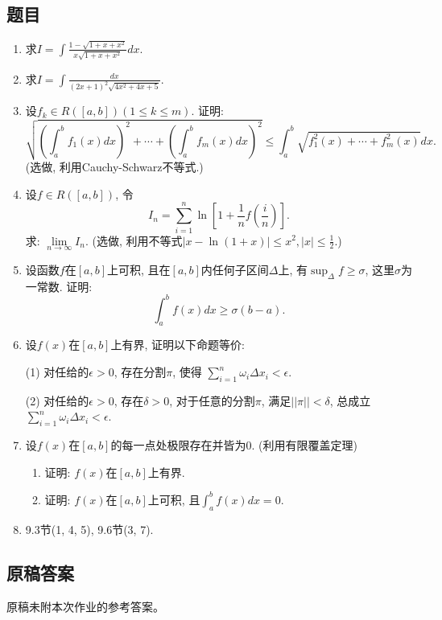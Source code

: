 \documentclass[UTF8,11pt, a4paper, oneside, fontset=none]{ctexbook}
\begin{document}
\subsection*{题目}
\begin{enumerate}

\item 求$I = \int \frac{1 - \sqrt{1 + x + x^2}}{x \sqrt{1 + x + x^2}}dx$.
\item 求$I = \int \frac{dx}{(2x+1)^2 \sqrt{4x^2 + 4x + 5}}$.

\item 设$f_k \in R([a, b]) (1 \leq k \leq m)$. 证明:
\[
\sqrt{ \left( \int_a^b f_1(x)dx \right)^2 + \cdots +  \left( \int_a^b f_m(x)dx \right)^2   } \leq \int_a^b \sqrt{f_1^2(x) + \cdots + f_m^2(x)} dx.
\]
(选做, 利用Cauchy-Schwarz不等式.)
\item 设$f \in R([a, b])$, 令
\[
I_n = \sum_{i=1}^n \ln \left[ 1 + \frac{1}{n}f\left( \frac{i}{n} \right) \right].
\]
求: $\lim\limits_{n \to \infty} I_n$.
(选做, 利用不等式$|x - \ln (1+x) | \leq x^2, |x| \leq \frac{1}{2}$.)
\item 设函数$f$在$[a, b]$上可积, 且在$[a, b]$内任何子区间$\Delta$上, 有$\sup_{\Delta} f \geq \sigma $, 这里$\sigma$为一常数. 证明:
\[
\int_a^b f(x) dx \geq \sigma (b-a).
\]

 
 \item 设$f(x)$在$[a, b]$上有界, 证明以下命题等价:

(1) 对任给的$\epsilon >0$, 存在分割$\pi$, 使得 $\sum_{i=1}^n \omega_i \Delta x_i< \epsilon$. 
 
(2) 对任给的$\epsilon >0$, 存在$\delta >0$, 对于任意的分割$\pi$, 满足$||\pi||< \delta$, 总成立 $\sum_{i=1}^n \omega_i \Delta x_i< \epsilon$.
 
\item 设$f(x)$在$[a, b]$的每一点处极限存在并皆为0. (利用有限覆盖定理)
\begin{enumerate}
\item 证明: $f(x)$在$[a, b]$上有界.
\item 证明: $f(x)$在$[a, b]$上可积, 且$\int_a^b f(x) dx = 0$.
 \end{enumerate}
 
 
 \item 9.3节(1, 4, 5), 9.6节(3, 7).

 
 
\end{enumerate}
\clearpage
\subsection*{原稿答案}
\noindent 原稿未附本次作业的参考答案。
\clearpage
\end{document}
